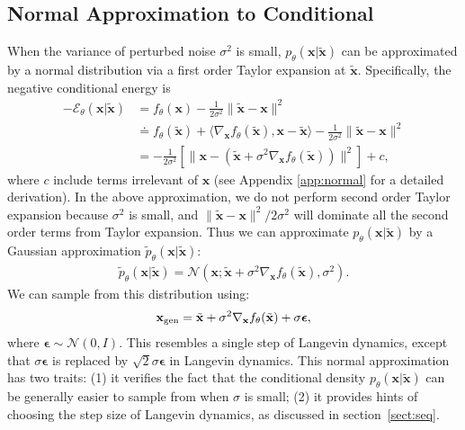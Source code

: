 \documentclass{article} \usepackage{iclr2021_conference,times}
\def\secref#1{section~\ref{#1}}
\def\rvx{{\mathbf{x}}}
\def\N{{\mathcal N}}
\def\trvx{\tilde{\rvx}}
\def\beps{\bm{\epsilon}}
\begin{document}
\subsection{Normal Approximation to Conditional}
When the variance of perturbed noise $\sigma^2$ is small, $p_\theta(\rvx|\trvx)$ can be approximated by a normal distribution via a first order Taylor expansion at $\trvx$. Specifically, the negative conditional energy is 
\begin{align} 
 - \mathcal{E}_\theta(\rvx|\trvx) &=   f_\theta(\rvx) - \frac{1}{2\sigma^2} \|\trvx-\rvx\|^2 \\
        &\doteq f_\theta(\trvx) + \langle \nabla_\rvx f_\theta(\trvx), \rvx-\trvx\rangle  - \frac{1}{2\sigma^2} \|\trvx-\rvx\|^2\\  
        &= - \frac{1}{2\sigma^2} \left[ \|\rvx - (\trvx + \sigma^2 \nabla_\rvx f_\theta(\trvx))\|^2\right] + c, \label{eq:normal1}
\end{align}
where ${c}$ include terms irrelevant of $\rvx$ (see Appendix \ref{app:normal} for a detailed derivation). In the above approximation, we do not perform second order Taylor expansion because $\sigma^2$ is small, and $\|\trvx-\rvx\|^2/2\sigma^2$ will dominate all the second order terms from Taylor expansion. 
Thus we can approximate $p_\theta(\rvx|\trvx)$ by a Gaussian approximation $\widetilde{p}_\theta(\rvx|\trvx)$:
\begin{eqnarray} 
    \widetilde{p}_\theta(\rvx|\trvx) = \N\left(\rvx ; \trvx + \sigma^2 \nabla_\rvx f_\theta(\trvx), \sigma^2\right). \label{eqn:normal}
\end{eqnarray}
We can sample from this distribution using: 
\begin{eqnarray} 
     \rvx_{\rm gen} = \trvx + \sigma^2 \nabla_\rvx f_\theta(\trvx) + \sigma \beps,\label{eq:normal_approx}
\end{eqnarray} 
where $\beps \sim \N(0, I)$. This resembles a single step of Langevin dynamics, except that $\sigma \beps$ is replaced by $\sqrt{2} \sigma \beps$ in Langevin dynamics. This normal approximation has two traits: (1) it verifies the fact that the conditional density $p_\theta(\rvx | \trvx)$ can be generally easier to sample from when $\sigma$ is small; (2) it provides hints of choosing the step size of Langevin dynamics, as discussed in \secref{sect:seq}.
\end{document}
